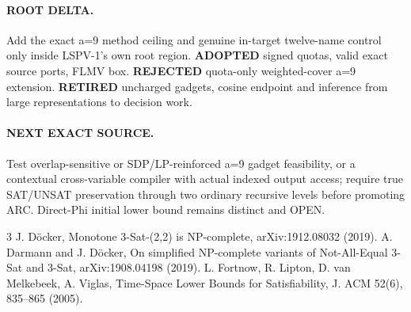 \documentclass[11pt]{article}
\begin{document}
\paragraph{ROOT DELTA.} Add the exact a=9 method ceiling and genuine in-target twelve-name control only inside LSPV-1's own root region. \textbf{ADOPTED} signed quotas, valid exact source ports, FLMV box. \textbf{REJECTED} quota-only weighted-cover a=9 extension. \textbf{RETIRED} uncharged gadgets, cosine endpoint and inference from large representations to decision work.
\paragraph{NEXT EXACT SOURCE.} Test overlap-sensitive or SDP/LP-reinforced a=9 gadget feasibility, or a contextual cross-variable compiler with actual indexed output access; require true SAT/UNSAT preservation through two ordinary recursive levels before promoting ARC. Direct-Phi initial lower bound remains distinct and OPEN.
\begin{thebibliography}{3}
 J. D\"ocker, Monotone 3-Sat-(2,2) is NP-complete, arXiv:1912.08032 (2019).
 A. Darmann and J. D\"ocker, On simplified NP-complete variants of Not-All-Equal 3-Sat and 3-Sat, arXiv:1908.04198 (2019).
 L. Fortnow, R. Lipton, D. van Melkebeek, A. Viglas, Time-Space Lower Bounds for Satisfiability, J. ACM 52(6), 835--865 (2005).
\end{thebibliography}
\end{document}
